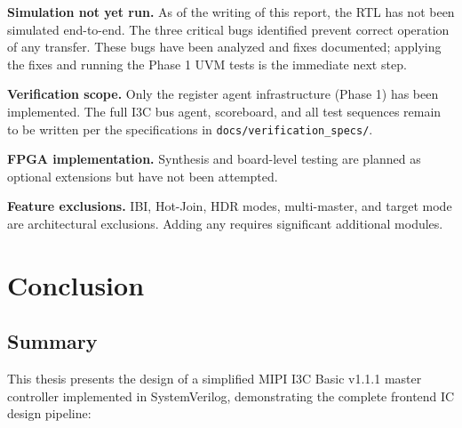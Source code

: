 \documentclass[12pt, a4paper, oneside]{report}
\newcommand{\file}[1]{\texttt{#1}}
\begin{document}
\textbf{Simulation not yet run.} As of the writing of this report, the RTL has not
been simulated end-to-end. The three critical bugs identified prevent correct
operation of any transfer. These bugs have been analyzed and fixes documented;
applying the fixes and running the Phase 1 UVM tests is the immediate next step.

\textbf{Verification scope.} Only the register agent infrastructure (Phase 1) has been
implemented. The full I3C bus agent, scoreboard, and all test sequences remain to be
written per the specifications in \file{docs/verification\_specs/}.

\textbf{FPGA implementation.} Synthesis and board-level testing are planned as optional
extensions but have not been attempted.

\textbf{Feature exclusions.} IBI, Hot-Join, HDR modes, multi-master, and target mode
are architectural exclusions. Adding any requires significant additional modules.

\chapter{Conclusion}

\section{Summary}

This thesis presents the design of a simplified MIPI I3C Basic v1.1.1 master
controller implemented in SystemVerilog, demonstrating the complete frontend IC
design pipeline:
\end{document}
